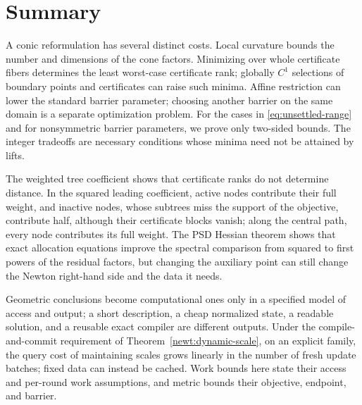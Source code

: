 \section{Summary}\label{sec:synthesis}
A conic reformulation has several distinct costs. Local curvature bounds
the number and dimensions of the cone factors. Minimizing over whole
certificate fibers determines the least worst-case certificate rank;
globally $C^1$ selections of boundary points and certificates can raise
such minima. Affine restriction can lower the standard barrier
parameter; choosing another barrier on the same domain is a separate
optimization problem. For the cases in \eqref{eq:unsettled-range} and
for nonsymmetric barrier parameters, we prove only two-sided bounds. The integer tradeoffs are necessary
conditions whose minima need not be attained by lifts.

The weighted tree coefficient shows that certificate ranks do not
determine distance. In the squared leading coefficient, active nodes
contribute their full weight, and inactive nodes, whose subtrees miss
the support of the objective, contribute half, although their
certificate blocks vanish; along the central path, every node contributes
its full weight. The PSD Hessian theorem shows that exact allocation
equations improve the spectral comparison from squared to first powers
of the residual factors, but changing the auxiliary point can still
change the Newton right-hand side and the data it needs.

Geometric conclusions become computational ones only in a specified
model of access and output; a short description, a cheap normalized
state, a readable solution, and a reusable exact compiler are
different outputs. Under the compile-and-commit requirement of
Theorem~\ref{newt:dynamic-scale}, on an explicit family, the query cost
of maintaining scales grows linearly in the number of fresh update
batches; fixed data can instead be cached. Work bounds here state their access and per-round work assumptions, and metric bounds
their objective, endpoint, and barrier.

